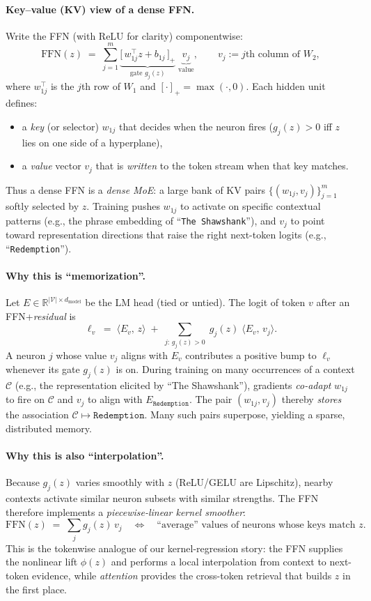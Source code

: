 \documentclass{article}
\begin{document}
\paragraph{Key–value (KV) view of a dense FFN.}
Write the FFN (with ReLU for clarity) componentwise:
\[
\mathrm{FFN}(z) \;=\; \sum_{j=1}^{m} \underbrace{\big[\,w_{1j}^{\top} z + b_{1j}\,\big]_+}_{\text{gate } g_j(z)}
\;\underbrace{v_j}_{\text{value}},\qquad
v_j := \text{$j$th column of }W_2,
\]
where $w_{1j}^{\top}$ is the $j$th row of $W_1$ and $[\cdot]_+=\max(\cdot,0)$. Each hidden unit defines:
\begin{itemize}[leftmargin=1.2em]
\item a \emph{key} (or selector) $w_{1j}$ that decides when the neuron fires (\(g_j(z)>0\) iff $z$ lies on one side of a hyperplane),
\item a \emph{value} vector $v_j$ that is \emph{written} to the token stream when that key matches.
\end{itemize}
Thus a dense FFN is a \emph{dense MoE}: a large bank of KV pairs $\{(w_{1j},v_j)\}_{j=1}^m$ softly selected by $z$. Training pushes $w_{1j}$ to activate on specific contextual patterns (e.g., the phrase embedding of “\texttt{The Shawshank}”), and $v_j$ to point toward representation directions that raise the right next-token logits (e.g., “\texttt{Redemption}”).

\paragraph{Why this is ``memorization''.}
Let $E\in\mathbb{R}^{|\mathcal{V}|\times d_{\mathrm{model}}}$ be the LM head (tied or untied). The logit of token $v$ after an FFN+\emph{residual} is
\[
\ell_v \;=\; \langle E_v,\, z \rangle \;+\; \sum_{j:\,g_j(z)>0}\; g_j(z)\;\langle E_v,\, v_j\rangle.
\]
A neuron $j$ whose value $v_j$ aligns with $E_v$ contributes a positive bump to $\ell_v$ whenever its gate $g_j(z)$ is on. During training on many occurrences of a context $\mathcal{C}$ (e.g., the representation elicited by “The Shawshank”), gradients \emph{co-adapt} $w_{1j}$ to fire on $\mathcal{C}$ and $v_j$ to align with $E_{\texttt{Redemption}}$. The pair \((w_{1j},v_j)\) thereby \emph{stores} the association $\mathcal{C}\mapsto \texttt{Redemption}$. Many such pairs superpose, yielding a sparse, distributed memory.

\paragraph{Why this is also ``interpolation''.}
Because $g_j(z)$ varies smoothly with $z$ (ReLU/GELU are Lipschitz), nearby contexts activate similar neuron subsets with similar strengths. The FFN therefore implements a \emph{piecewise-linear kernel smoother}:
\[
\mathrm{FFN}(z)\;=\;\sum_j g_j(z)\,v_j
\quad\Longleftrightarrow\quad
\text{``average'' values of neurons whose keys match $z$.}
\]
This is the tokenwise analogue of our kernel-regression story: the FFN supplies the nonlinear lift $\phi(z)$ and performs a local interpolation from context to next-token evidence, while \emph{attention} provides the cross-token retrieval that builds $z$ in the first place.
\end{document}
